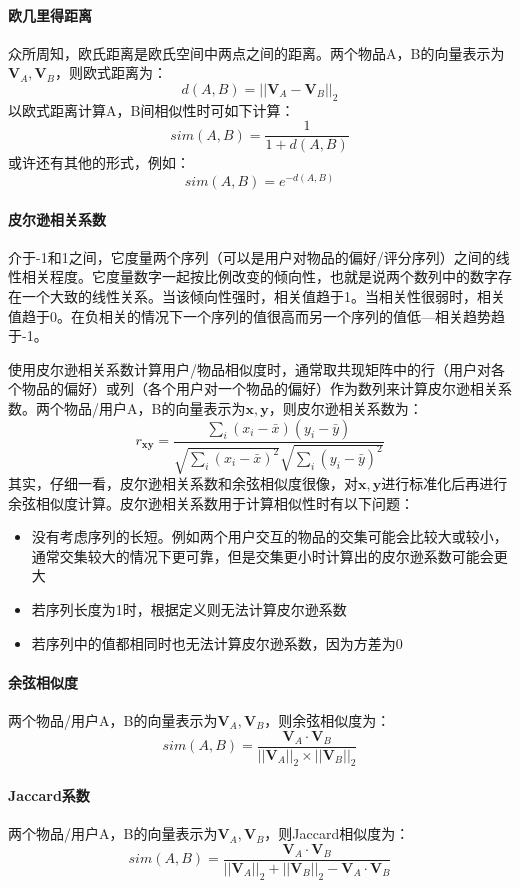 \paragraph{欧几里得距离}
众所周知，欧氏距离是欧氏空间中两点之间的距离。两个物品A，B的向量表示为$\boldsymbol{V}_A, \boldsymbol{V}_B$，则欧式距离为：
$$
d(A, B) = ||\boldsymbol{V}_A - \boldsymbol{V}_B||_2
$$
以欧式距离计算A，B间相似性时可如下计算：
$$
sim(A, B) = \frac{1}{1 + d(A, B)}
$$
或许还有其他的形式，例如：
$$
sim(A, B) = e^{-d(A, B)}
$$

\paragraph{皮尔逊相关系数}
介于-1和1之间，它度量两个序列（可以是用户对物品的偏好/评分序列）之间的线性相关程度。它度量数字一起按比例改变的倾向性，也就是说两个数列中的数字存在一个大致的线性关系。当该倾向性强时，相关值趋于1。当相关性很弱时，相关值趋于0。在负相关的情况下一个序列的值很高而另一个序列的值低---相关趋势趋于-1。

使用皮尔逊相关系数计算用户/物品相似度时，通常取共现矩阵中的行（用户对各个物品的偏好）或列（各个用户对一个物品的偏好）作为数列来计算皮尔逊相关系数。两个物品/用户A，B的向量表示为$\boldsymbol{x}, \boldsymbol{y}$，则皮尔逊相关系数为：
$$
r_{\boldsymbol{xy}} = \frac{\sum_i (x_i - \bar{x})(y_i - \bar{y})}{\sqrt{\sum_i (x_i - \bar{x})^2} \sqrt{\sum_i (y_i - \bar{y})^2}}
$$
其实，仔细一看，皮尔逊相关系数和余弦相似度很像，对$\boldsymbol{x}, \boldsymbol{y}$进行标准化后再进行余弦相似度计算。皮尔逊相关系数用于计算相似性时有以下问题：
\begin{itemize}
	\item 没有考虑序列的长短。例如两个用户交互的物品的交集可能会比较大或较小，通常交集较大的情况下更可靠，但是交集更小时计算出的皮尔逊系数可能会更大
	\item 若序列长度为1时，根据定义则无法计算皮尔逊系数
	\item 若序列中的值都相同时也无法计算皮尔逊系数，因为方差为0
\end{itemize}


\paragraph{余弦相似度}
两个物品/用户A，B的向量表示为$\boldsymbol{V}_A, \boldsymbol{V}_B$，则余弦相似度为：
$$
sim(A, B) = \frac{\boldsymbol{V}_A \cdot \boldsymbol{V}_B}{||\boldsymbol{V}_A||_2 \times ||\boldsymbol{V}_B||_2}
$$

\paragraph{Jaccard系数}
两个物品/用户A，B的向量表示为$\boldsymbol{V}_A, \boldsymbol{V}_B$，则Jaccard相似度为：
$$
sim(A, B) = \frac{\boldsymbol{V}_A \cdot \boldsymbol{V}_B}{||\boldsymbol{V}_A||_2 + ||\boldsymbol{V}_B||_2 - \boldsymbol{V}_A \cdot \boldsymbol{V}_B}
$$

